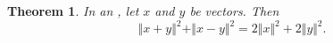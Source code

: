 \documentclass[12pt]{article}
\begin{document}
\newtheorem{thm}{Theorem}
\begin{thm} In an , let $x$ and $y$ be vectors. Then
$$ \Vert  x + y  \Vert ^ 2 +  \Vert x - y  \Vert ^2 = 2    \Vert x  \Vert ^ 2 + 2 \Vert  y \Vert  ^ 2.$$
\end{thm}
\end{document}
